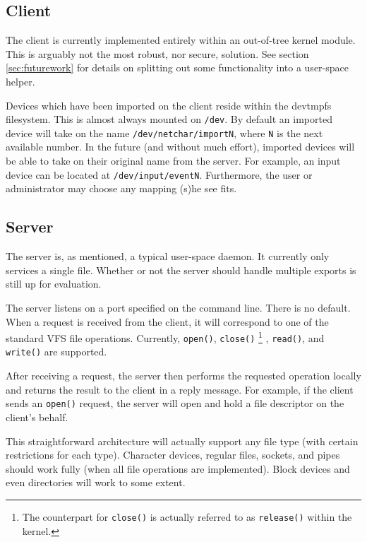 \documentclass[11pt,twocolumn]{article}
\begin{document}
\subsection{Client}

The client is currently implemented entirely within an out-of-tree kernel
module. This is arguably not the most robust, nor secure, solution. See
section \ref{sec:futurework} for details on splitting out some functionality
into a user-space helper.

Devices which have been imported on the client reside within the
devtmpfs filesystem. This is almost always mounted on \texttt{/dev}. By
default an imported device will take on the name
\texttt{/dev/netchar/importN}, where \texttt{N} is the next available
number. In the future (and without much effort), imported devices will
be able to take on their original name from the server. For example, an
input device can be located at \texttt{/dev/input/eventN}. Furthermore,
the user or administrator may choose any mapping (s)he see fits.

\subsection{Server}

The server is, as mentioned, a typical user-space daemon. It
currently only services a single file. Whether or not the server should
handle multiple exports is still up for evaluation.

The server listens on a port specified on the command line. There is no
default. When a request is received from the client, it will correspond
to one of the standard VFS file operations. Currently, \texttt{open()},
\texttt{close()}
\footnote{The counterpart for \texttt{close()} is actually referred to
as \texttt{release()} within the kernel.}
, \texttt{read()}, and \texttt{write()} are supported.

After receiving a request, the server then performs the requested
operation locally and returns the result to the client in a reply
message. For example, if the client sends an \texttt{open()} request,
the server will open and hold a file descriptor on the client's behalf.

This straightforward architecture will actually support any file type
(with certain restrictions for each type). Character devices, regular
files, sockets, and pipes should work fully (when all file operations
are implemented). Block devices and even directories will work to some
extent.
\end{document}
